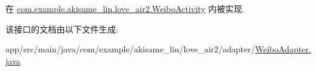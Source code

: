 在 \mbox{\hyperlink{classcom_1_1example_1_1akisame__lin_1_1love__air2_1_1_weibo_activity_aedbe554dbde01c133839bb1a274faaca}{com.\+example.\+akisame\+\_\+lin.\+love\+\_\+air2.\+Weibo\+Activity}} 内被实现.



该接口的文档由以下文件生成\+:\begin{DoxyCompactItemize}
\item 
app/src/main/java/com/example/akisame\+\_\+lin/love\+\_\+air2/adapter/\mbox{\hyperlink{_weibo_adapter_8java}{Weibo\+Adapter.\+java}}\end{DoxyCompactItemize}
